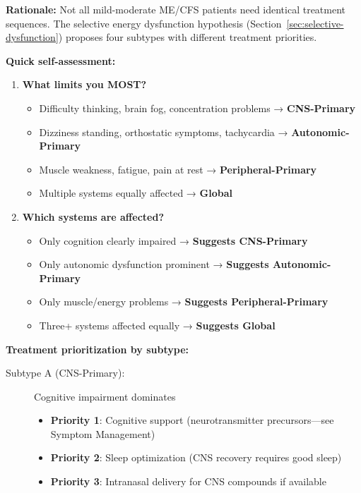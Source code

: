 \begin{recommendation}
\label{rec:subtype-mild-moderate}

\textbf{Rationale:} Not all mild-moderate ME/CFS patients need identical treatment sequences. The selective energy dysfunction hypothesis (Section~\ref{sec:selective-dysfunction}) proposes four subtypes with different treatment priorities.

\textbf{Quick self-assessment:}

\begin{enumerate}
    \item \textbf{What limits you MOST?}
    \begin{itemize}
        \item Difficulty thinking, brain fog, concentration problems → \textbf{CNS-Primary}
        \item Dizziness standing, orthostatic symptoms, tachycardia → \textbf{Autonomic-Primary}
        \item Muscle weakness, fatigue, pain at rest → \textbf{Peripheral-Primary}
        \item Multiple systems equally affected → \textbf{Global}
    \end{itemize}

    \item \textbf{Which systems are affected?}
    \begin{itemize}
        \item Only cognition clearly impaired → \textbf{Suggests CNS-Primary}
        \item Only autonomic dysfunction prominent → \textbf{Suggests Autonomic-Primary}
        \item Only muscle/energy problems → \textbf{Suggests Peripheral-Primary}
        \item Three+ systems affected equally → \textbf{Suggests Global}
    \end{itemize}
\end{enumerate}

\textbf{Treatment prioritization by subtype:}

\begin{description}
    \item[Subtype A (CNS-Primary):] Cognitive impairment dominates
    \begin{itemize}
        \item \textbf{Priority 1}: Cognitive support (neurotransmitter precursors—see Symptom Management)
        \item \textbf{Priority 2}: Sleep optimization (CNS recovery requires good sleep)
        \item \textbf{Priority 3}: Intranasal delivery for CNS compounds if available
    \end{itemize}


\end{description}
\end{recommendation}
